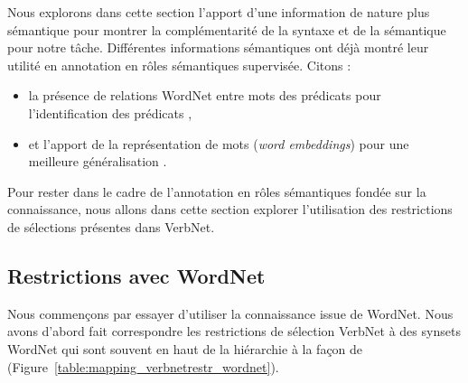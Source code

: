 Nous explorons dans cette section l'apport d'une information de nature plus
sémantique pour montrer la complémentarité de la syntaxe et de la sémantique
pour notre tâche. Différentes informations sémantiques ont déjà montré leur
utilité en annotation en rôles sémantiques supervisée. Citons :

\begin{itemize}
    \item la présence de relations WordNet entre mots des prédicats pour
        l'identification des prédicats \citep{das2010probabilistic},
    \item et l'apport de la représentation de mots (\textit{word embeddings})
        pour une meilleure généralisation \citep{lechelle2014utilisation}.
\end{itemize}

Pour rester dans le cadre de l'annotation en rôles sémantiques fondée sur la
connaissance, nous allons dans cette section explorer l'utilisation des
restrictions de sélections présentes dans VerbNet.

\subsection{Restrictions avec WordNet}
\label{restrictions_wordnet}

Nous commençons par essayer d'utiliser la connaissance issue de WordNet.  Nous
avons d'abord fait correspondre les restrictions de sélection VerbNet à des
synsets WordNet qui sont souvent en haut de la hiérarchie à la façon de
\citep{shi2005putting} (Figure~\ref{table:mapping_verbnetrestr_wordnet}).

